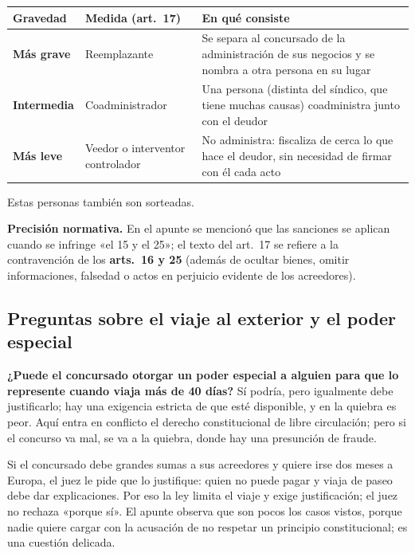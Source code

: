 \documentclass[12pt,oneside]{book}
\begin{document}
\begingroup
\small
\renewcommand{\arraystretch}{1.25}
\begin{tabularx}{\textwidth}{>{\raggedright\arraybackslash}p{} >{\raggedright\arraybackslash}p{} Y}
\toprule
\textbf{Gravedad} & \textbf{Medida (art.~17)} & \textbf{En qué consiste} \\
\midrule
\textbf{Más grave} & Reemplazante & Se separa al concursado de la administración de sus negocios y se nombra a otra persona en su lugar \\
\textbf{Intermedia} & Coadministrador & Una persona (distinta del síndico, que tiene muchas causas) coadministra junto con el deudor \\
\textbf{Más leve} & Veedor o interventor controlador & No administra: fiscaliza de cerca lo que hace el deudor, sin necesidad de firmar con él cada acto \\
\bottomrule
\end{tabularx}
\endgroup

\medskip
Estas personas también son sorteadas.

\begin{note}
\textbf{Precisión normativa.} En el apunte se mencionó que las sanciones se aplican cuando se infringe «el 15 y el 25»; el texto del art.~17 se refiere a la contravención de los \textbf{arts.~16 y 25} (además de ocultar bienes, omitir informaciones, falsedad o actos en perjuicio evidente de los acreedores).
\end{note}

\subsection{Preguntas sobre el viaje al exterior y el poder especial}

\textbf{¿Puede el concursado otorgar un poder especial a alguien para que lo represente cuando viaja más de 40 días?} Sí podría, pero igualmente debe justificarlo; hay una exigencia estricta de que esté disponible, y en la quiebra es peor. Aquí entra en conflicto el derecho constitucional de libre circulación; pero si el concurso va mal, se va a la quiebra, donde hay una presunción de fraude.

Si el concursado debe grandes sumas a sus acreedores y quiere irse dos meses a Europa, el juez le pide que lo justifique: quien no puede pagar y viaja de paseo debe dar explicaciones. Por eso la ley limita el viaje y exige justificación; el juez no rechaza «porque sí». El apunte observa que son pocos los casos vistos, porque nadie quiere cargar con la acusación de no respetar un principio constitucional; es una cuestión delicada.
\end{document}
